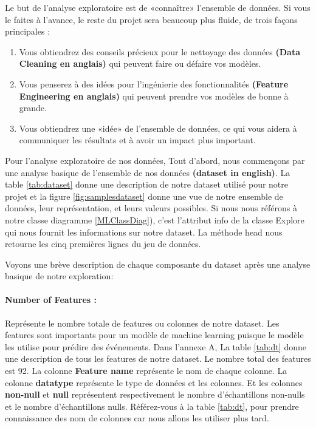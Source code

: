 \documentclass[12pt, french]{report}
\begin{document}
Le but de l'analyse exploratoire est de «connaître» l'ensemble de données. Si vous le faites à l'avance, le reste du projet sera beaucoup plus fluide, de trois façons principales \cite{key20}:
\begin{enumerate}
\item Vous obtiendrez des conseils précieux pour le nettoyage des données \textbf{(Data Cleaning en anglais)} qui peuvent faire ou défaire vos modèles.
\item Vous penserez à des idées pour l'ingénierie des fonctionnalités \textbf{(Feature Engineering en anglais)} qui peuvent prendre vos modèles de bonne à grande.
\item Vous obtiendrez une «idée» de l'ensemble de données, ce qui vous aidera à communiquer les résultats et à avoir un impact plus important.
\end{enumerate}

Pour l'analyse exploratoire de nos données, Tout d'abord, nous commençons par une analyse basique de l'ensemble de nos données \textbf{(dataset in english)}. La table \ref{tab:dataset} donne une description de notre dataset utilisé pour notre projet et la figure \ref{fig:samplesdataset} donne une vue de notre ensemble de données, leur représentation, et leurs valeurs possibles. Si nous nous référons à notre classe diagramme \ref{MLClassDiag}), c'est l'attribut info de la classe Explore qui nous fournit les informations sur notre dataset. La méthode head nous retourne les cinq premières lignes du jeu de données.

Voyons une brève description de chaque composante du dataset après une analyse basique de notre exploration:

\paragraph*{Number of Features :} Représente le nombre totale de features ou colonnes de notre dataset. Les features sont importants pour un modèle de machine learning puisque le modèle les utilise pour prédire des événements. Dans l'annexe A, La table \ref{tab:dt} donne une description de tous les features de notre dataset. Le nombre total des features est 92.  La colonne \textbf{Feature name} représente le nom de chaque colonne. La colonne \textbf{datatype} représente le type de données et les colonnes. Et les colonnes \textbf{non-null} et \textbf{null} représentent respectivement le nombre d'échantillons non-nulls et le nombre d'échantillons nulls. Référez-vous à la table \ref{tab:dt}, pour prendre connaissance des nom de colonnes car nous allons les utiliser plus tard. 
\end{document}
